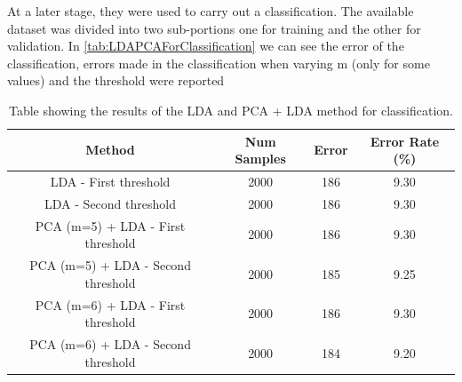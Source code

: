 At a later stage, they were used to carry out a classification.
The available dataset was divided into two sub-portions one for training and the other for validation.
In \autoref{tab:LDAPCAForClassification} we can see the error of the classification,
errors made in the classification when varying m (only for some values) and the threshold were reported

\begin{table}
    \centering
    \begin{tabular}{c c c c}
        \toprule
        \textbf{Method}                    & \textbf{Num Samples} & \textbf{Error} & \textbf{Error Rate} (\%) \\
        \midrule
        LDA - First threshold              & 2000                 & 186            & 9.30                     \\
        LDA - Second threshold             & 2000                 & 186            & 9.30                     \\
        \midrule
        PCA (m=5) + LDA - First threshold  & 2000                 & 186            & 9.30                     \\
        PCA (m=5) + LDA - Second threshold & 2000                 & 185            & 9.25                     \\
        PCA (m=6) + LDA - First threshold  & 2000                 & 186            & 9.30                     \\
        PCA (m=6) + LDA - Second threshold & 2000                 & 184            & 9.20                     \\
        \bottomrule
    \end{tabular}
    \captionsetup{justification=justified,singlelinecheck=false,format=hang}
    \caption{Table showing the results of the LDA and PCA + LDA method for classification.}
    \label{tab:LDAPCAForClassification}
\end{table}








